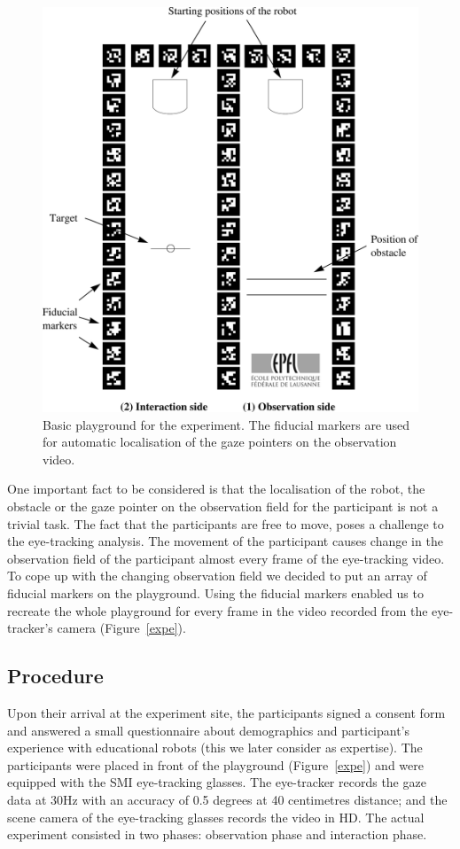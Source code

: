 \documentclass{sig-alternate}
\begin{document}
\begin{figure}
    \centering
    \includegraphics[width=0.9\linewidth]{maze}
    \caption{\small Basic playground for the experiment. The fiducial markers
    are used for automatic localisation of the gaze pointers on the observation
    video.}

    \label{playground}
\end{figure}

One important fact to be considered is that the localisation of the
robot, the obstacle or the gaze pointer on the observation field for the
participant is not a trivial task. The fact that the participants are
free to move, poses a challenge to the eye-tracking analysis. The
movement of the participant causes change in the observation field of
the participant almost every frame of the eye-tracking video. To cope up
with the changing observation field we decided to put an array of
fiducial markers on the playground. Using the fiducial markers enabled
us to recreate the whole playground for every frame in the video
recorded from the eye-tracker's camera (Figure~\ref{expe}).

\subsection{Procedure}

Upon their arrival at the experiment site, the participants signed a consent
form and answered a small questionnaire about demographics and participant's
experience with educational robots (this we later consider as expertise). The
participants were placed in front of the playground (Figure~\ref{expe}) and were
equipped with the SMI eye-tracking glasses. The eye-tracker records the gaze
data at 30Hz with an accuracy of 0.5 degrees at 40 centimetres distance; and the
scene camera of the eye-tracking glasses records the video in HD.  The actual
experiment consisted in two phases: observation phase and interaction phase.
\end{document}
